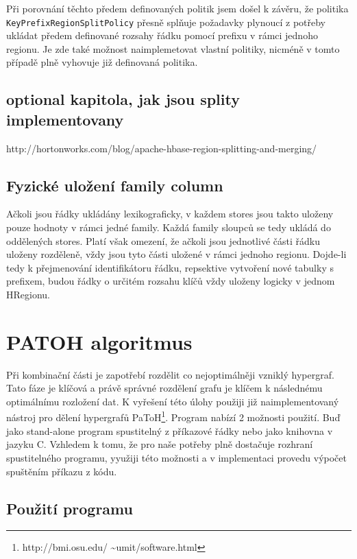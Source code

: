 \documentclass[thesis=M,czech]{FITthesis}[2012/06/26]
\begin{document}
Při porovnání těchto předem definovaných politik jsem došel k závěru, že politika \texttt{KeyPrefixRegionSplitPolicy} přesně splňuje požadavky plynoucí z potřeby ukládat předem definované rozsahy řádku pomocí prefixu v rámci jednoho regionu. Je zde také možnost naimplemetovat vlastní politiky, nicméně v tomto případě plně vyhovuje již definovaná politika.

\subsection{optional kapitola, jak jsou splity implementovany}
http://hortonworks.com/blog/apache-hbase-region-splitting-and-merging/

\subsection{Fyzické uložení family column}
Ačkoli jsou řádky ukládány lexikograficky, v každem stores jsou takto uloženy pouze hodnoty v rámci jedné family. Každá family sloupců se tedy ukládá do oddělených stores. Platí však omezení, že ačkoli jsou jednotlivé části řádku uloženy rozděleně, vždy jsou tyto části uložené v rámci jednoho regionu. Dojde-li tedy k přejmenování identifikátoru řádku, repsektive vytvoření nové tabulky s prefixem, budou řádky o určitém rozsahu klíčů vždy uloženy logicky v jednom HRegionu.

\section{PATOH algoritmus}
Při kombinační části je zapotřebí rozdělit co nejoptimálněji vzniklý hypergraf. Tato fáze je klíčová a právě správné rozdělení grafu je klíčem k následnému optimálnímu rozložení dat. K vyřešení této úlohy použiji již naimplementovaný nástroj pro dělení hypergrafů PaToH\footnote{http://bmi.osu.edu/ \textasciitilde umit/software.html}. Program nabízí 2 možnosti použití. Buď jako stand-alone program spustitelný z příkazové řádky nebo jako knihovna v jazyku C. Vzhledem k tomu, že pro naše potřeby plně dostačuje rozhraní spustitelného programu, yyužiji této možnosti a v implementaci provedu výpočet spuštěním příkazu z kódu. 

\subsection{Použití programu}
\end{document}
